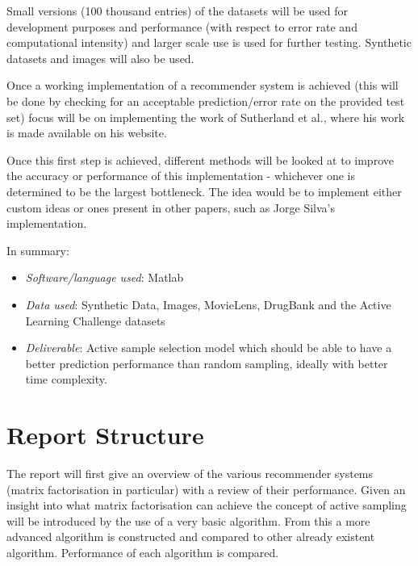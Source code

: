 Small versions (100 thousand entries) of the datasets will be used for development purposes and performance (with respect to error rate and computational intensity) and larger scale use is used for further testing. Synthetic datasets and images will also be used.

Once a working implementation of a recommender system is achieved (this will be done by checking for an acceptable prediction/error rate on the provided test set) focus will be on implementing the work of Sutherland et al.\cite{active-mf}, where his work is made available on his website.

Once this first step is achieved, different methods will be looked at to improve the accuracy or performance of this implementation -  whichever one is determined to be the largest bottleneck. The idea would be to implement either custom ideas or ones present in other papers, such as Jorge Silva's\cite{silva} implementation.

In summary:
\begin{itemize}
\item \textit{Software/language used}: Matlab
\item \textit{Data used}: Synthetic Data, Images, MovieLens, DrugBank and the Active Learning Challenge datasets
\item \textit{Deliverable}: Active sample selection model which should be able to have a better prediction performance than random sampling, ideally with better time complexity.
\end{itemize}

\section{Report Structure}
The report will first give an overview of the various recommender systems (matrix factorisation in particular) with a review of their performance. Given an insight into what matrix factorisation can achieve the concept of active sampling will be introduced by the use of a very basic algorithm. From this a more advanced algorithm is constructed and compared to other already existent algorithm. Performance of each algorithm is compared.


